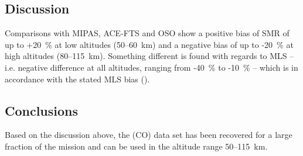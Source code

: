 \subsection{Discussion}
\label{sec:fm22:discussion}
Comparisons with MIPAS, ACE-FTS and OSO show a positive bias of SMR of up to
+20~\% at low altitudes (50--60~km) and a negative bias of up to -20~\% at
high altitudes (80--115~km). Something different is found with regards to MLS
-- i.e. negative difference at all altitudes, ranging from -40~\% to -10~\%
-- which is in accordance with the stated MLS bias (\cite{Errera2019}).



\subsection{Conclusions}
\label{sec:fm22:conclusions}
Based on the discussion above, the \chem(CO) data set has been recovered for a large fraction of the mission and can be used in the altitude range 50--115~km.
